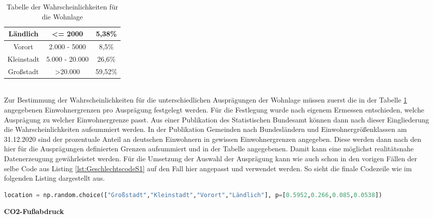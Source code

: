 \begin{onehalfspace}
\begin{table}[!h]
\begin{tabular}{|c|c|c|}
    Ländlich              & \textless{}= 2000        & 5,38\%                      \\ \hline
    Vorort                & 2.000 - 5000             & 8,5\%                       \\ \hline
    Kleinstadt            & 5.000 - 20.000           & 26,6\%                      \\ \hline
    Großstadt             & \textgreater 20.000      & 59,52\%                     \\ \hline
    \end{tabular}
    \caption{Tabelle der Wahrscheinlichkeiten für die Wohnlage}
    \label{table:10}
\end{table}\\
Zur Bestimmung der Wahrscheinlichkeiten für die unterschiedlichen Ausprägungen der Wohnlage müssen zuerst die in der Tabelle \ref{table:10} angegebenen Einwohnergrenzen pro Ausprägung festgelegt werden. Für die Festlegung wurde nach eigenem Ermessen entschieden, welche Ausprägung zu welcher Einwohnergrenze passt. Aus einer Publikation des Statistischen Bundesamt können dann nach dieser Eingliederung die Wahrscheinlichkeiten aufsummiert werden. In der Publikation \glqq{}Gemeinden nach Bundesländern und Einwohnergrößenklassen am 31.12.2020\grqq{} sind der prozentuale Anteil an deutschen Einwohnern in gewissen Einwohnergrenzen angegeben. Diese werden dann nach den hier für die Ausprägungen definierten Grenzen aufsummiert und in der Tabelle angegebenen. Damit kann eine möglichst realitätsnahe Datenerzeugung gewährleistet werden. Für die Umsetzung der Auswahl der Ausprägung kann wie auch schon in den vorigen Fällen der selbe Code aus Listing \ref{lst:GeschlechtscodeS1} auf den Fall hier angepasst und verwendet werden. So sieht die finale Codezeile wie im folgenden Listing dargestellt aus.
\begin{lstlisting}[language=Python,label={lst:Sz2AuswahlWohnlage},caption=Codezeile zur Auswahl der Ausprägung der Wohnlage basierend auf angegebenen Wahrscheinlichkeiten]
location = np.random.choice(["Großstadt","Kleinstadt","Vorort","Ländlich"], p=[0.5952,0.266,0.085,0.0538])
\end{lstlisting}
\textbf{CO2-Fußabdruck}\\

\end{onehalfspace}
